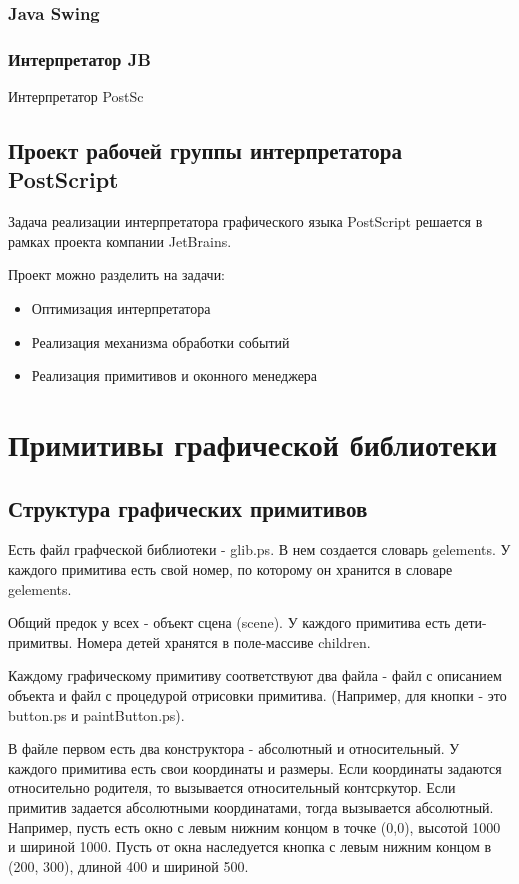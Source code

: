 \documentclass[14pt]{extarticle}
\begin{document}
		\subsubsection{Java Swing}
		\subsubsection{ Интерпретатор JB }
		Интерпретатор PostSc
		
	\subsection{ Проект рабочей группы интерпретатора PostScript }
Задача реализации интерпретатора графического языка PostScript решается в рамках проекта компании JetBrains. 
		
		Проект можно разделить на задачи:
		\begin{itemize}
		\item Оптимизация интерпретатора
		\item Реализация механизма обработки событий
		\item Реализация примитивов и оконного менеджера		
		\end{itemize}	
	
	\pagebreak
	\section{Примитивы графической библиотеки}
	\subsection{Структура графических примитивов}
		Есть файл графческой библиотеки - glib.ps. В нем создается словарь gelements. У каждого примитива есть свой номер, по которому он хранится в словаре gelements. 
		
		Общий предок у всех - объект сцена (scene). У каждого примитива есть дети-примитвы. Номера детей хранятся в поле-массиве children.
		
		Каждому графическому примитиву соответствуют два файла - файл с описанием объекта и файл с процедурой отрисовки примитива. (Например, для кнопки - это button.ps и paintButton.ps). 
		
		В файле первом есть два конструктора - абсолютный и относительный. У каждого примитива есть свои координаты и размеры. Если координаты задаются относительно родителя, то вызывается относительный контсркутор. Если примитив задается абсолютными координатами, тогда вызывается абсолютный. Например, пусть есть окно с левым нижним концом в точке (0,0), высотой 1000 и шириной 1000. Пусть от окна наследуется кнопка с левым нижним концом в (200, 300), длиной 400 и шириной 500. 
		
\end{document}
